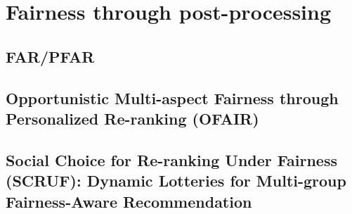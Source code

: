 \chapter{Fairness through post-processing}
\label{fairness_postproc}


\section{FAR/PFAR}
    

\section{Opportunistic Multi-aspect Fairness through Personalized Re-ranking (OFAIR)}
    
    
\section{Social Choice for Re-ranking Under Fairness (SCRUF): Dynamic Lotteries for Multi-group Fairness-Aware Recommendation}

